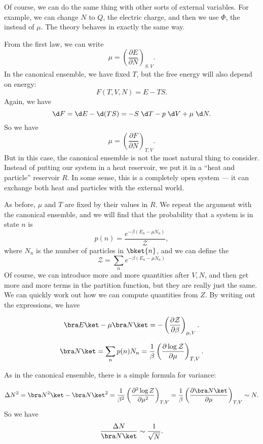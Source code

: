 \documentclass[a4paper]{article}
\begin{document}
Of course, we can do the same thing with other sorts of external variables. For example, we can change $N$ to $Q$, the electric charge, and then we use $\Phi$, the  instead of $\mu$. The theory behaves in exactly the same way.

From the first law, we can write
\[
  \mu = \left(\frac{\partial E}{\partial N}\right)_{S, V}.
\]
In the canonical ensemble, we have fixed $T$, but the free energy will also depend on energy:
\[
  F(T, V, N) = E - TS.
\]
Again, we have
\[
  \d F = \d E - \d (TS) = -S\;\d T - p\;\d V + \mu\;\d N.
\]
So we have
\[
  \mu = \left(\frac{\partial F}{\partial N}\right)_{T, V}.
\]
But in this case, the canonical ensemble is not the most natural thing to consider. Instead of putting our system in a heat reservoir, we put it in a ``heat and particle'' reservoir $R$. In some sense, this is a completely open system --- it can exchange both heat and particles with the external world.

As before, $\mu$ and $T$ are fixed by their values in $R$. We repeat the argument with the canonical ensemble, and we will find that the probability that a system is in state $n$ is
\[
  p(n) = \frac{e^{-\beta (E_n - \mu N_n)}}{\mathcal{Z}},
\]
where $N_n$ is the number of particles in $\bket{n}$, and we can define the 
\[
  \mathcal{Z} = \sum_n e^{-\beta(E_n- \mu N_n)}
\]
Of course, we can introduce more and more quantities after $V, N$, and then get more and more terms in the partition function, but they are really just the same. We can quickly work out how we can compute quantities from $Z$. By writing out the expressions, we have
\begin{prop}
  \[
    \bra E \ket - \mu \bra N\ket = -\left(\frac{\partial \mathcal{Z}}{\partial \beta}\right)_{\mu, V}.
  \]
\end{prop}

\begin{prop}
  \[
    \bra N\ket = \sum_n p(n) N_n = \frac{1}{\beta} \left(\frac{\partial \log \mathcal{Z}}{\partial \mu}\right)_{T, V}.
  \]
\end{prop}

As in the canonical ensemble, there is a simple formula for variance:
\begin{prop}
  \[
    \Delta N^2 = \bra N^2 \ket - \bra N\ket^2 = \frac{1}{\beta^2} \left(\frac{\partial^2 \log Z}{\partial \mu^2}\right)_{T, V} = \frac{1}{\beta} \left(\frac{\partial \bra N\ket}{\partial \mu}\right)_{T, V} \sim N.
  \]
  So we have
  \[
    \frac{\Delta N}{ \bra N\ket} \sim \frac{1}{\sqrt{N}}.
  \]
\end{prop}
\end{document}
